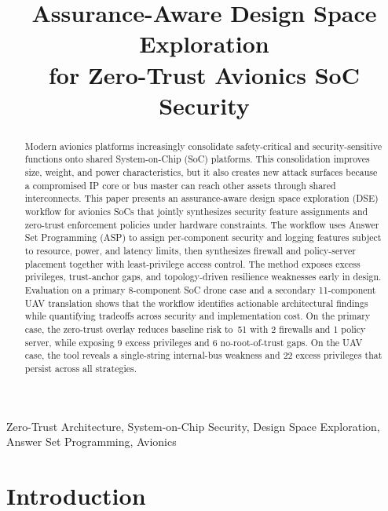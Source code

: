 \documentclass[conference]{IEEEtran}
\begin{document}
\title{Assurance-Aware Design Space Exploration\\
for Zero-Trust Avionics SoC Security}

\author{}

\maketitle

\begin{abstract}
Modern avionics platforms increasingly consolidate safety-critical and
security-sensitive functions onto shared System-on-Chip (SoC) platforms.
This consolidation improves size, weight, and power characteristics, but it
also creates new attack surfaces because a compromised IP core or bus master
can reach other assets through shared interconnects. This paper presents an
assurance-aware design space exploration (DSE) workflow for avionics SoCs
that jointly synthesizes security feature assignments and zero-trust
enforcement policies under hardware constraints. The workflow uses Answer Set
Programming (ASP) to assign per-component security and logging features
subject to resource, power, and latency limits, then synthesizes firewall and
policy-server placement together with least-privilege access control. The
method exposes excess privileges, trust-anchor gaps, and topology-driven
resilience weaknesses early in design. Evaluation on a primary 8-component
SoC drone case and a secondary 11-component UAV translation shows that the
workflow identifies actionable architectural findings while quantifying
tradeoffs across security and implementation cost. On the primary case, the
zero-trust overlay reduces baseline risk to~51 with 2 firewalls and 1 policy
server, while exposing 9 excess privileges and 6 no-root-of-trust gaps. On
the UAV case, the tool reveals a single-string internal-bus weakness and 22
excess privileges that persist across all strategies.
\end{abstract}

\begin{IEEEkeywords}
Zero-Trust Architecture, System-on-Chip Security, Design Space Exploration,
Answer Set Programming, Avionics
\end{IEEEkeywords}

\section{Introduction}
\end{document}
